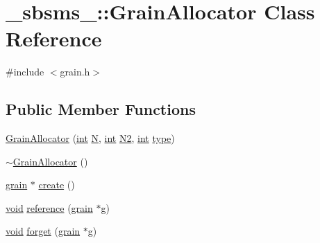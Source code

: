 \hypertarget{class__sbsms___1_1_grain_allocator}{}\section{\+\_\+sbsms\+\_\+\+:\+:Grain\+Allocator Class Reference}
\label{class__sbsms___1_1_grain_allocator}


{\ttfamily \#include $<$grain.\+h$>$}

\subsection*{Public Member Functions}
\begin{DoxyCompactItemize}
\item 
\hyperlink{class__sbsms___1_1_grain_allocator_a14455439284dc213f52e24edc0c867ec}{Grain\+Allocator} (\hyperlink{xmltok_8h_a5a0d4a5641ce434f1d23533f2b2e6653}{int} \hyperlink{class__sbsms___1_1_grain_allocator_a5ba148d38f360042f21d828522353fd2}{N}, \hyperlink{xmltok_8h_a5a0d4a5641ce434f1d23533f2b2e6653}{int} \hyperlink{class__sbsms___1_1_grain_allocator_a19cc9a8c5f0d4ebb834e5ce27f60e135}{N2}, \hyperlink{xmltok_8h_a5a0d4a5641ce434f1d23533f2b2e6653}{int} \hyperlink{class__sbsms___1_1_grain_allocator_a5ac786aafdb92d5a78a929c6accf48d0}{type})
\item 
\hyperlink{class__sbsms___1_1_grain_allocator_aaf5938e839aa56b247fbd26dab179802}{$\sim$\+Grain\+Allocator} ()
\item 
\hyperlink{class__sbsms___1_1grain}{grain} $\ast$ \hyperlink{class__sbsms___1_1_grain_allocator_a72c900b55988711f3c6361971d099fd2}{create} ()
\item 
\hyperlink{sound_8c_ae35f5844602719cf66324f4de2a658b3}{void} \hyperlink{class__sbsms___1_1_grain_allocator_a6055a59a09b05a8d3743d00382795e9c}{reference} (\hyperlink{class__sbsms___1_1grain}{grain} $\ast$g)
\item 
\hyperlink{sound_8c_ae35f5844602719cf66324f4de2a658b3}{void} \hyperlink{class__sbsms___1_1_grain_allocator_ad5f73ddb0a111f4744a7d45fe0942319}{forget} (\hyperlink{class__sbsms___1_1grain}{grain} $\ast$g)
\end{DoxyCompactItemize}
